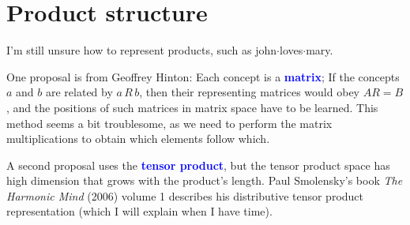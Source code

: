\documentclass[12pt]{article}
\newcommand{\concept}[1]{\textbf{\textcolor{blue}{#1}}}
\newcommand{\formula}[1]{\textcolor{LogicColor}{#1}}
\begin{document}

\section{Product structure}

I'm still unsure how to represent products, such as \formula{john$\cdot$loves$\cdot$mary}.

One proposal is from Geoffrey Hinton:  Each concept is a \concept{matrix};  If the concepts $a$ and $b$ are related by $a\, R\, b$, then their representing matrices would obey $ AR = B $, and the positions of such matrices in matrix space have to be learned.  This method seems a bit troublesome, as we need to perform the matrix multiplications to obtain which elements follow which.

A second proposal uses the \concept{tensor product}, but the tensor product space has high dimension that grows with the product's length.  Paul Smolensky's book \textit{The Harmonic Mind} (2006) volume 1 describes his distributive tensor product representation (which I will explain when I have time).
\end{document}
